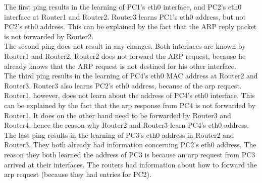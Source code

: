 The first ping results in the learning of PC1's eth0 interface, and PC2's eth0 interface at Router1 and Router2. Router3 learns PC1's eth0 address, but not PC2's eth0 address. This can be explained by the fact that the ARP reply packet is not forwarded by Router2. \\

The second ping does not result in any changes. Both interfaces are known by Router1 and Router2. Router2 does not forward the ARP request, because he already knows that the ARP request is not destined for his other interface. \\

The third ping results in the learning of PC4's eth0 MAC address at Router2 and Router3. Router3 also learns PC2's eth0 address, because of the arp request. Router1, however, does not learn about the address of PC4's eth0 interface. This can be explained by the fact that the arp response from PC4 is not forwarded by Router1. It does on the other hand need to be forwarded by Router3 and Router4, hence the reason why Router2 and Router3 learn PC4's eth0 address. \\

The last ping results in the learning of PC3's eth0 address in Router2 and Router3. They both already had information concerning PC2's eth0 address. The reason they both learned the address of PC3 is because an arp request from PC3 arrived at their interfaces. The routers had information about how to forward the arp request (because they had entries for PC2). \\

